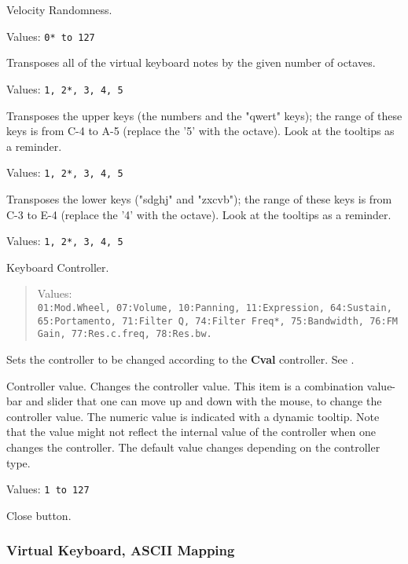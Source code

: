   Velocity Randomness.

   Values: \texttt{0* to 127}

   Transposes all of the virtual keyboard notes by the given number of
   octaves.

   Values: \texttt{1, 2*, 3, 4, 5}

   Transposes the upper keys (the numbers and the "qwert" keys);
   the range of these keys is from C-4 to A-5 (replace the '5' with the octave).
   Look at the tooltips as a reminder.

   Values: \texttt{1, 2*, 3, 4, 5}

   Transposes the lower keys ("sdghj" and "zxcvb"); the range of these keys is
   from C-3 to E-4 (replace the '4' with the octave).  Look at the tooltips as a
   reminder.

   Values: \texttt{1, 2*, 3, 4, 5}

   Keyboard Controller.
   \begin{quote}
   Values:\\
   \texttt{01:Mod.Wheel, 07:Volume, 10:Panning,
      11:Expression, 64:Sustain, 65:Portamento, 71:Filter Q,
      74:Filter Freq*, 75:Bandwidth, 76:FM Gain,
      77:Res.c.freq, 78:Res.bw.}
    \end{quote}

   Sets the controller to be changed according to the \textbf{Cval}
   controller.
   See .

   Controller value.
   Changes the controller value.
   This item is a combination value-bar and slider that one
   can move up and down with the mouse, to change the controller value. The
   numeric value is indicated with a dynamic tooltip. Note that the value might
   not reflect the internal value of the controller when one changes the
   controller. The default value changes depending on the controller type.

   Values: \texttt{1 to 127}

   Close button.

\subsubsection{Virtual Keyboard, ASCII Mapping}
\label{subsubsec:virtual_keyboard_ascii}

